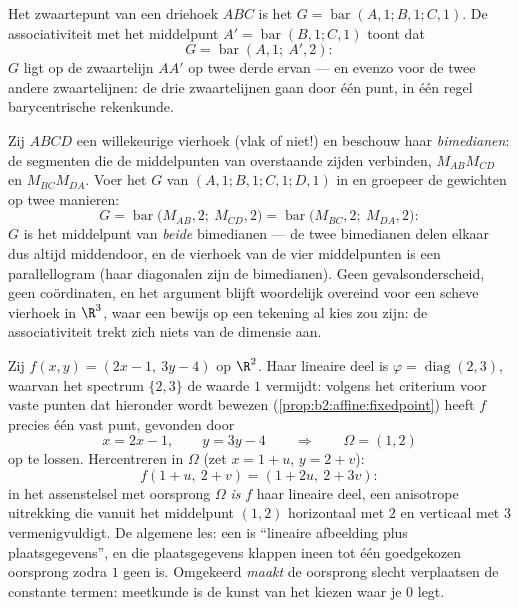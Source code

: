 \begin{example}\label{ex:b2:affine:median}
Het zwaartepunt van een driehoek $ABC$ is het  $G =
\operatorname{bar}(A,1; B,1; C,1)$. De associativiteit met het
middelpunt $A' = \operatorname{bar}(B, 1; C, 1)$ toont dat
\[
G = \operatorname{bar}(A, 1;\ A', 2) :
\]
$G$ ligt op de zwaartelijn $AA'$ op twee derde ervan --- en evenzo
voor de twee andere zwaartelijnen: de drie zwaartelijnen gaan door
één punt, in één regel barycentrische rekenkunde.
\end{example}

\begin{example}\label{ex:b2:affine:bimedians}
Zij $ABCD$ een willekeurige vierhoek (vlak of niet!) en beschouw
haar \emph{bimedianen}: de segmenten die de middelpunten van
overstaande zijden verbinden, $M_{AB}M_{CD}$ en $M_{BC}M_{DA}$.
Voer het  $G$ van $(A,1; B,1; C,1; D,1)$ in en groepeer
de gewichten op twee manieren:
\[
G = \operatorname{bar}\bigl(M_{AB}, 2;\ M_{CD}, 2\bigr)
= \operatorname{bar}\bigl(M_{BC}, 2;\ M_{DA}, 2\bigr) :
\]
$G$ is het middelpunt van \emph{beide} bimedianen --- de twee
bimedianen delen elkaar dus altijd middendoor, en de vierhoek van
de vier middelpunten is een parallellogram (haar diagonalen zijn de
bimedianen). Geen gevalsonderscheid, geen coördinaten, en het
argument blijft woordelijk overeind voor een scheve vierhoek in
$\R^3$, waar een bewijs op een tekening al kies zou zijn: de
associativiteit trekt zich niets van de dimensie aan.
\end{example}

\begin{example}\label{ex:b2:affine:dilation}
Zij $f(x, y) = (2x - 1,\ 3y - 4)$ op $\R^2$. Haar lineaire deel is
$\varphi = \operatorname{diag}(2, 3)$, waarvan het spectrum $\{2,
3\}$ de waarde $1$ vermijdt: volgens het criterium voor vaste
punten dat hieronder wordt bewezen
(\cref{prop:b2:affine:fixedpoint}) heeft $f$ precies één vast punt,
gevonden door
\[
x = 2x - 1, \qquad y = 3y - 4
\qquad\Longrightarrow\qquad \Omega = (1, 2)
\]
op te lossen. Hercentreren in $\Omega$ (zet $x = 1 + u$, $y = 2 +
v$):
\[
f(1 + u,\ 2 + v) = (1 + 2u,\ 2 + 3v) :
\]
in het assenstelsel met oorsprong $\Omega$ \emph{is} $f$ haar
lineaire deel, een anisotrope uitrekking die vanuit het middelpunt
$(1, 2)$ horizontaal met $2$ en verticaal met $3$ vermenigvuldigt.
De algemene les: een  is ``lineaire afbeelding
plus plaatsgegevens'', en die plaatsgegevens klappen ineen tot één
goedgekozen oorsprong zodra $1$ geen  is. Omgekeerd
\emph{maakt} de oorsprong slecht verplaatsen de constante termen:
 meetkunde is de kunst van het kiezen waar je $0$ legt.
\end{example}

